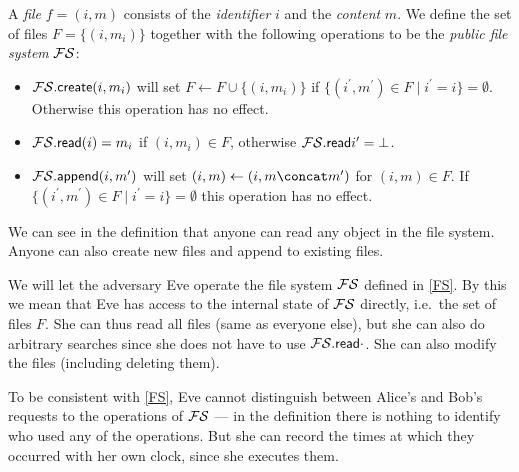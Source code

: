 \begin{definition}\label{FS}
  A \emph{file} \(f = (i, m)\) consists of the \emph{identifier} \(i\) and the 
  \emph{content} \(m\).
  We define the set of files \(F = \{(i, m_i)\}\) together with the following 
  operations to be the \emph{public file system} \(\FS\):
  \begin{itemize}
    \item \(\fscreate[i][m_i]\) will set \(F\gets F\cup \{(i, m_i)\}\) if 
      \(\{(i^\prime, m^\prime)\in F \mid i^\prime = i\} = \emptyset\).
      Otherwise this operation has no effect.

    \item \(\fsread[i] = m_i\) if \((i, m_i)\in F\), otherwise 
      \(\fsread{i^\prime} = \bot\).

    \item \(\fsappend[i][m^\prime]\) will set \((i, m)\gets (i, m\concat 
        m^\prime)\) for \((i, m)\in F\).
      If \(\{(i^\prime, m^\prime)\in F\mid i^\prime = i\} = \emptyset\) this 
      operation has no effect.
  \end{itemize}
\end{definition}

We can see in the definition that anyone can read any object in the file 
system.
Anyone can also create new files and append to existing files.

%

We will let the adversary Eve operate the file system \(\FS\) defined in 
\cref{FS}.
By this we mean that Eve has access to the internal state of \(\FS\) directly, 
i.e.\ the set of files \(F\).
She can thus read all files (same as everyone else), but she can also do 
arbitrary searches since she does not have to use \(\fsread{\cdot}\).
She can also modify the files (including deleting them).

To be consistent with \cref{FS}, Eve cannot distinguish between Alice's and 
Bob's requests to the operations of \(\FS\) --- in the definition there is 
nothing to identify who used any of the operations.
But she can record the times at which they occurred with her own clock, since 
she executes them.


